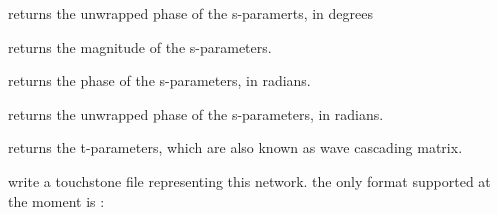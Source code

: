 \documentclass[letterpaper,10pt,english]{sphinxmanual}
\begin{document}
\begin{fulllineitems}
\begin{fulllineitems}
\end{fulllineitems}


\begin{fulllineitems}
\label{api/mwavepy:mwavepy.network.Network.s_deg_unwrap}
returns the unwrapped phase of the s-paramerts, in degrees

\end{fulllineitems}


\begin{fulllineitems}
\label{api/mwavepy:mwavepy.network.Network.s_mag}
returns the magnitude of the s-parameters.

\end{fulllineitems}


\begin{fulllineitems}
\label{api/mwavepy:mwavepy.network.Network.s_rad}
returns the phase of the s-parameters, in radians.

\end{fulllineitems}


\begin{fulllineitems}
\label{api/mwavepy:mwavepy.network.Network.s_rad_unwrap}
returns the unwrapped phase of the s-parameters, in radians.

\end{fulllineitems}


\begin{fulllineitems}
\label{api/mwavepy:mwavepy.network.Network.t}
returns the t-parameters, which are also known as wave cascading
matrix.

\end{fulllineitems}


\begin{fulllineitems}
\label{api/mwavepy:mwavepy.network.Network.write_touchstone}
write a touchstone file representing this network.  the only 
format supported at the moment is :
\begin{quote}


\end{quote}
\end{fulllineitems}
\end{fulllineitems}
\end{document}
